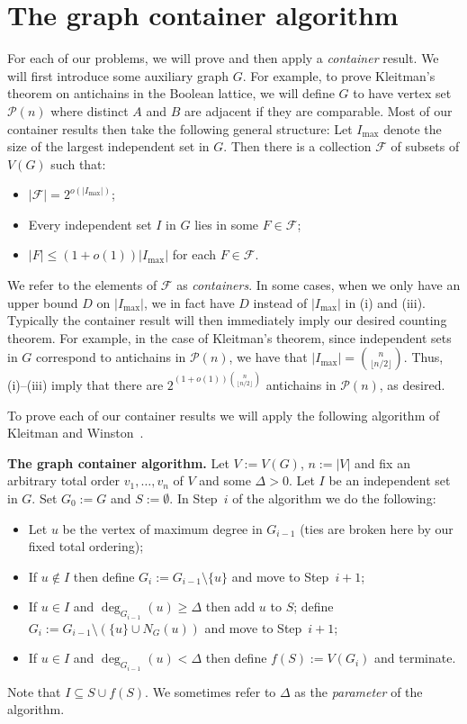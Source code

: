 \documentclass[11pt]{article}
\numberwithin{equation}{section}
\def\COMMENT#1{}
\begin{document}
\COMMENT{define$\sim$}



\section{The graph container algorithm}\label{sec:over}
For each of our problems, we will prove and then apply a \emph{container} result. We will first introduce some auxiliary graph $G$. For example, to prove Kleitman's theorem on antichains in the Boolean lattice, we will
define $G$ to have vertex set $\mathcal P(n)$ where distinct $A$ and $B$ are adjacent if they are comparable. Most of our container results then take the following general structure:
Let $I_{\max}$ denote the size of the largest independent set in $G$. Then there is a collection $\mathcal F$ of subsets of $V(G)$ such that:
\begin{itemize}
\item[(i)] $|\mathcal F|=2^{o(|I_{\max}|)}$;
\item[(ii)]  Every independent set $I$ in $G$ lies in some $F \in \mathcal F$;
\item[(iii)] $|F| \leq (1+o(1))|I_{\max}|$ for each $F \in \mathcal F$.
\end{itemize}
We refer to the elements of $\mathcal F$ as \emph{containers}. In some cases, when we only have an upper bound $ D$ on  $|I_{\max}|$, we in fact have $D$ instead of $|I_{\max}|$ in (i) and (iii).
Typically the container result will then immediately imply our desired counting theorem. For example, in the case of Kleitman's theorem, since independent sets in $G$ correspond to antichains in $\mathcal P(n)$,  we have that $|I_{\max}|=\binom{n}{\lfloor n/2 \rfloor}$. Thus, (i)--(iii) imply that there are $2^{(1+o(1))\binom{n}{\lfloor n/2 \rfloor}}$ antichains in $\mathcal P(n)$, as desired.

To prove each of our container results we will apply the following algorithm of Kleitman and Winston~\cite{kw1, kw2}.

\smallskip

{\noindent \bf The graph container algorithm.} Let  $V:=V(G)$, $n:=|V|$ and fix an arbitrary total order $v_1,\dots , v_n$ of $V$ and some $\Delta>0$. Let $I$ be an independent set in $G$. Set $G_0 :=G$ and $S:=\emptyset$. In Step~$i$ of the algorithm we do the following:
\begin{itemize}
\item[(a)] Let $u$ be the vertex of maximum degree in $G_{i-1}$ (ties are broken here by our fixed total ordering);
\item[(b)] If $u \notin I$ then define $G_i:= G_{i-1}\setminus \{u\}$ and move to Step~$i+1$;
\item[(c)] If $u \in I$ and $\deg _{G_{i-1} }(u) \geq \Delta $ then add $u$ to $S$; define $G_i:= G_{i-1}\setminus( \{u\}\cup N_G (u))$ and move to Step~$i+1$;
\item[(d)] If $u \in I$ and $\deg _{G_{i-1}} (u) < \Delta $ then define  $f(S):=V(G_i)$ and terminate.
\end{itemize}
Note that $I \subseteq S \cup f(S)$. We sometimes refer to $\Delta$ as the \emph{parameter} of the algorithm.
\end{document}
